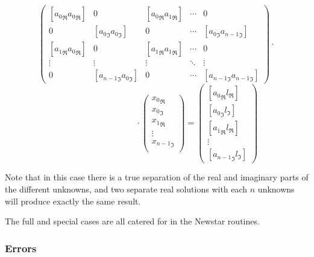 \begin{displaymath}
	\left( \begin{array}{ccccc}
	\left[ {a_{0}}_{\Re}{a_{0}}_{\Re}\right] & 0 &
		\left[ {a_{0}}_{\Re}{a_{1}}_{\Re}\right] &  \cdots & 0 \\
	0 & \left[ {a_{0}}_{\Im}{a_{0}}_{\Im} \right] & 0 &
		\cdots & \left[ {a_{0}}_{\Im}{a_{n-1}}_{\Im}\right] \\
	\left[ {a_{1}}_{\Re}{a_{0}}_{\Re}\right] & 0 &
		 \left[ {a_{1}}_{\Re}{a_{1}}_{\Re}\right] & \cdots & 0 \\
	\vdots       & \vdots & \vdots      & \ddots & \vdots \\
	0 & \left[ {a_{n-1}}_{\Im}{a_{0}}_{\Im}\right] & 0 &
		\cdots & \left[ {a_{n-1}}_{\Im}{a_{n-1}}_{\Im} \right]
	       \end{array} \right) \cdot
\end{displaymath}
\begin{equation}
	\hspace{4cm} \cdot \left( \begin{array} {c}
		     {x_{0}}_{\Re} \\
			{x_{0}}_{\Im} \\
			{x_{1}}_{\Re} \\
			\vdots \\
			{x_{n-1}}_{\Im} \\
		     \end{array} \right) =
	\left( \begin{array} {c}
	\left[ {a_{0}}_{\Re}l_{\Re}\right] \\
	\left[ {a_{0}}_{\Im}l_{\Im}\right] \\
	\left[ {a_{1}}_{\Re}l_{\Re}\right] \\
	\vdots \\
	\left[ {a_{n-1}}_{\Im}l_{\Im}\right]
	       \end{array} \right)
			\label{.e.solscr}
\end{equation}

Note that in this case there is a true separation of the real and imaginary
parts of the different unknowns, and two separate real solutions with each
$n$ unknowns will produce exactly the same result.

The full and special cases are all catered for in the Newstar routines.

\subsubsection{Errors}

